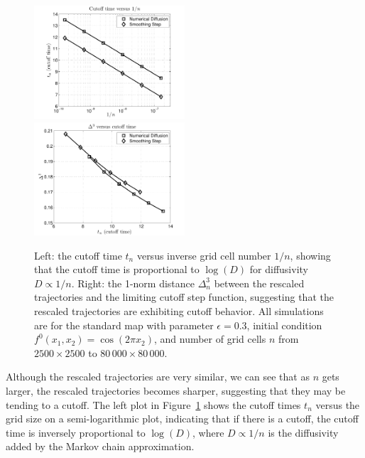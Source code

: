 \documentclass{aims}
\theoremstyle{definition}
\begin{document}
\begin{figure}
  \centerline{
    \includegraphics[width=0.5\textwidth,trim=0 0 0 22,clip=true]{cutofftimevsD}
    \includegraphics[width=0.5\textwidth,trim=0 0 0 22,clip=true]{areavscutofftime}
  }
  \caption{\label{cutofftimeandarea} Left: the cutoff time $t_n$
    versus inverse grid cell number $1/n$, showing that the cutoff
    time is proportional to $\log(D)$ for diffusivity $D \propto
    1/n$. Right: the 1-norm distance $\Delta_n^3$ between the rescaled
    trajectories and the limiting cutoff step function, suggesting
    that the rescaled trajectories are exhibiting cutoff behavior. All
    simulations are for the standard map with parameter $\epsilon =
    0.3$, initial condition $f^0(x_1,x_2) = \cos(2\pi x_2)$, and
    number of grid cells $n$ from $2500 \times 2500$ to $80\,000
    \times 80\,000$.}
\end{figure}

Although the rescaled trajectories are very similar, we can see that
as $n$ gets larger, the rescaled trajectories becomes sharper,
suggesting that they may be tending to a cutoff. The left plot in
Figure~\ref{cutofftimeandarea} shows the cutoff times $t_n$ versus the
grid size on a semi-logarithmic plot, indicating that if there is a
cutoff, the cutoff time is inversely proportional to $\log(D)$, where
$D \propto 1/n$ is the diffusivity added by the Markov chain
approximation.
\end{document}
